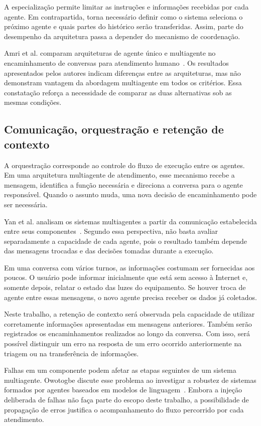 A especialização permite limitar as instruções e informações recebidas por cada agente. Em contrapartida, torna necessário definir como o sistema seleciona o próximo agente e quais partes do histórico serão transferidas. Assim, parte do desempenho da arquitetura passa a depender do mecanismo de coordenação.

Amri et al. comparam arquiteturas de agente único e multiagente no encaminhamento de conversas para atendimento humano~\cite{amri2026}. Os resultados apresentados pelos autores indicam diferenças entre as arquiteturas, mas não demonstram vantagem da abordagem multiagente em todos os critérios. Essa constatação reforça a necessidade de comparar as duas alternativas sob as mesmas condições.

\subsection{Comunicação, orquestração e retenção de contexto}
\label{subsec:comunicacao-contexto}

A orquestração corresponde ao controle do fluxo de execução entre os agentes. Em uma arquitetura multiagente de atendimento, esse mecanismo recebe a mensagem, identifica a função necessária e direciona a conversa para o agente responsável. Quando o assunto muda, uma nova decisão de encaminhamento pode ser necessária.

Yan et al. analisam os sistemas multiagentes a partir da comunicação estabelecida entre seus componentes~\cite{yan2026}. Segundo essa perspectiva, não basta avaliar separadamente a capacidade de cada agente, pois o resultado também depende das mensagens trocadas e das decisões tomadas durante a execução.

Em uma conversa com vários turnos, as informações costumam ser fornecidas aos poucos. O usuário pode informar inicialmente que está sem acesso à Internet e, somente depois, relatar o estado das luzes do equipamento. Se houver troca de agente entre essas mensagens, o novo agente precisa receber os dados já coletados.

Neste trabalho, a retenção de contexto será observada pela capacidade de utilizar corretamente informações apresentadas em mensagens anteriores. Também serão registrados os encaminhamentos realizados ao longo da conversa. Com isso, será possível distinguir um erro na resposta de um erro ocorrido anteriormente na triagem ou na transferência de informações.

Falhas em um componente podem afetar as etapas seguintes de um sistema multiagente. Owotogbe discute esse problema ao investigar a robustez de sistemas formados por agentes baseados em modelos de linguagem~\cite{owotogbe2025}. Embora a injeção deliberada de falhas não faça parte do escopo deste trabalho, a possibilidade de propagação de erros justifica o acompanhamento do fluxo percorrido por cada atendimento.

